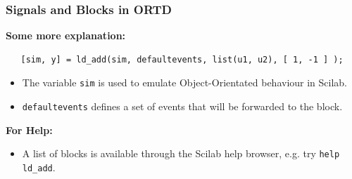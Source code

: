 \documentclass[serif,9pt,xcolor=dvipsnames]{beamer}
\begin{document}
\begin{frame}[fragile]
\frametitle{Signals and Blocks in ORTD}
 
 \textbf{Some more explanation:}

{\small 
\begin{lstlisting}
   [sim, y] = ld_add(sim, defaultevents, list(u1, u2), [ 1, -1 ] );
\end{lstlisting}}
 
 \begin{itemize}
  \item The variable \texttt{sim} is used to emulate Object-Orientated behaviour in Scilab.
\item \texttt{defaultevents} defines a set of events that will be forwarded to the block.
 \end{itemize}

 \vspace{1.5cm}

\textbf{For Help:}
 \begin{itemize}
  \item A list of blocks is available through the Scilab help browser, e.g. try \texttt{help ld\_add}.
 \end{itemize}
 

\end{frame}
\end{document}
